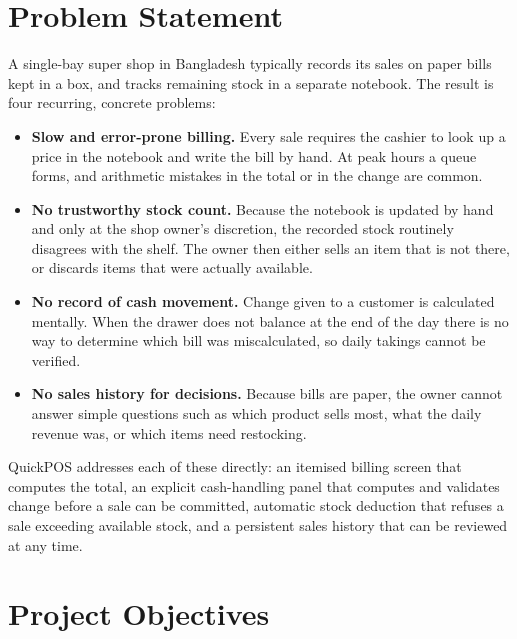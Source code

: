 \documentclass[11pt,a4paper]{article}
\begin{document}
\section{Problem Statement}

A single-bay super shop in Bangladesh typically records its sales on paper bills kept in a
box, and tracks remaining stock in a separate notebook. The result is four recurring,
concrete problems:

\begin{itemize}
  \item \textbf{Slow and error-prone billing.} Every sale requires the cashier to look up a
        price in the notebook and write the bill by hand. At peak hours a queue forms, and
        arithmetic mistakes in the total or in the change are common.
  \item \textbf{No trustworthy stock count.} Because the notebook is updated by hand and only
        at the shop owner's discretion, the recorded stock routinely disagrees with the
        shelf. The owner then either sells an item that is not there, or discards items that
        were actually available.
  \item \textbf{No record of cash movement.} Change given to a customer is calculated
        mentally. When the drawer does not balance at the end of the day there is no way to
        determine which bill was miscalculated, so daily takings cannot be verified.
  \item \textbf{No sales history for decisions.} Because bills are paper, the owner cannot
        answer simple questions such as which product sells most, what the daily revenue was,
        or which items need restocking.
\end{itemize}

QuickPOS addresses each of these directly: an itemised billing screen that computes the
total, an explicit cash-handling panel that computes and validates change before a sale can
be committed, automatic stock deduction that refuses a sale exceeding available stock, and a
persistent sales history that can be reviewed at any time.

\section{Project Objectives}
\end{document}
